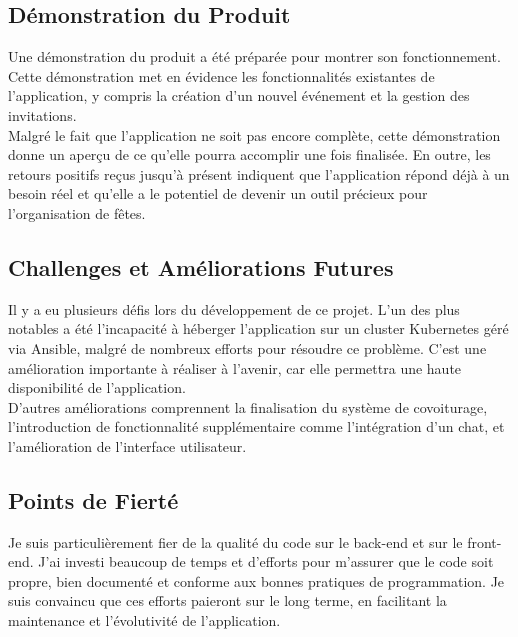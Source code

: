 \subsection{Démonstration du Produit}\label{subsec:demonstration-du-produit}

Une démonstration du produit a été préparée pour montrer son fonctionnement.
Cette démonstration met en évidence les fonctionnalités existantes de l'application, y compris la création d'un nouvel événement et la gestion des invitations.\\

Malgré le fait que l'application ne soit pas encore complète, cette démonstration donne un aperçu de ce qu'elle pourra accomplir une fois finalisée.
En outre, les retours positifs reçus jusqu'à présent indiquent que l'application répond déjà à
un besoin réel et qu'elle a le potentiel de devenir un outil précieux pour l'organisation de fêtes.

\subsection{Challenges et Améliorations Futures}\label{subsec:challenges-et-ameliorations-futures}

Il y a eu plusieurs défis lors du développement de ce projet.
L'un des plus notables a été l'incapacité à héberger l'application sur un cluster Kubernetes géré via Ansible,
malgré de nombreux efforts pour résoudre ce problème.
C'est une amélioration importante à réaliser à l'avenir, car elle permettra une haute disponibilité de l'application.\\

D'autres améliorations comprennent la finalisation du système de covoiturage, l'introduction de fonctionnalité supplémentaire comme l'intégration d'un chat,
et l'amélioration de l'interface utilisateur.

\subsection{Points de Fierté}\label{subsec:points-de-fierte}

Je suis particulièrement fier de la qualité du code sur le back-end et sur le front-end.
J'ai investi beaucoup de temps et d'efforts pour m'assurer que le code soit propre, bien documenté et conforme aux bonnes pratiques de programmation.
Je suis convaincu que ces efforts paieront sur le long terme, en facilitant la maintenance et l'évolutivité de l'application.